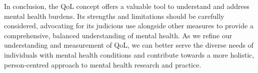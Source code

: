 \documentclass[10pt]{article}
\begin{document}
\begin{sloppypar}
  In conclusion, the QoL concept offers a valuable tool to understand and address mental health burdens. Its strengths and limitations should be carefully considered, advocating for its judicious use alongside other measures to provide a comprehensive, balanced understanding of mental health. As we refine our understanding and measurement of QoL, we can better serve the diverse needs of individuals with mental health conditions and contribute towards a more holistic, person-centred approach to mental health research and practice.

  \pagebreak
  \singlespacing %
  
  

\end{sloppypar}
\end{document}
